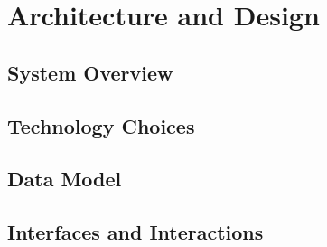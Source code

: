 \section{Architecture and Design}
\label{sec:architecture}

\subsection{System Overview}


\subsection{Technology Choices}

\subsection{Data Model}

\subsection{Interfaces and Interactions}
